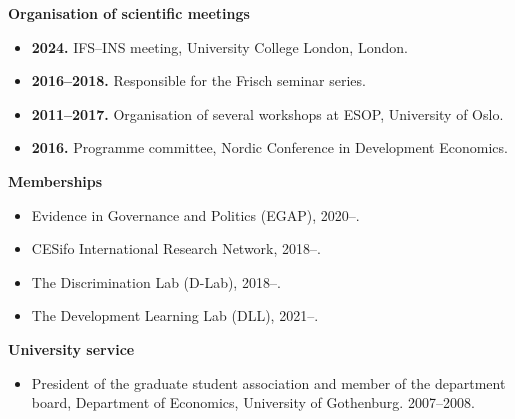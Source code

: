 \documentclass[11pt]{article}
\begin{document}
\vspace{0.4em}
\textbf{Organisation of scientific meetings}
\begin{itemize}
  \item \textbf{2024.} IFS--INS meeting, University College London, London.
  \item \textbf{2016--2018.} Responsible for the Frisch seminar series.
  \item \textbf{2011--2017.} Organisation of several workshops at ESOP, University of Oslo.
  \item \textbf{2016.} Programme committee, Nordic Conference in Development Economics.
\end{itemize}

\vspace{0.4em}
\textbf{Memberships}
\begin{itemize}
  \item Evidence in Governance and Politics (EGAP), 2020--.
  \item CESifo International Research Network, 2018--.
  \item The Discrimination Lab (D-Lab), 2018--.
  \item The Development Learning Lab (DLL), 2021--.
\end{itemize}

\vspace{0.4em}
\textbf{University service}
\begin{itemize}
  \item President of the graduate student association and member of the department board, Department of Economics, University of Gothenburg. 2007--2008.
\end{itemize}
\end{document}

